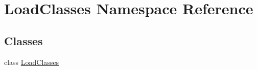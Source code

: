 \hypertarget{namespace_load_classes}{\section{Load\-Classes Namespace Reference}
\label{namespace_load_classes}
}
\subsection*{Classes}
\begin{DoxyCompactItemize}
\item 
class \hyperlink{class_load_classes_1_1_load_classes}{Load\-Classes}
\end{DoxyCompactItemize}
